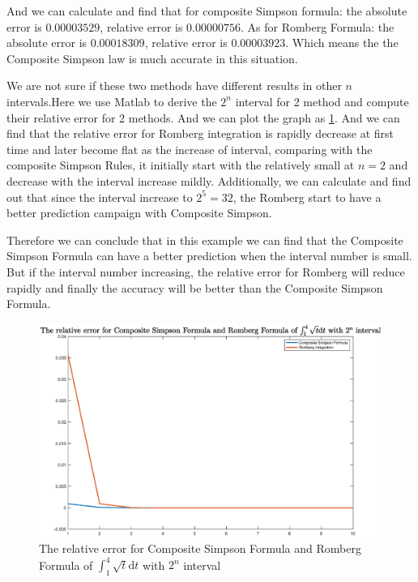 \begin{solution}
And we can calculate and find that for composite Simpson	 formula: the absolute error is $0.00003529$,
 relative error is $0.00000756$. As for Romberg Formula: the absolute error is $0.00018309$, relative error is $0.00003923$. Which means the the Composite Simpson law is much accurate in this situation. 
 
 
We are not sure if these two methods have different results in other $n$ intervals.Here we use Matlab to derive the $2^n$ interval for 2 method and compute their relative error for 2 methods. And we can plot the  graph as \ref{Q3_graph}. And we can find that the relative error for Romberg integration is rapidly decrease at first time and later become flat as the increase of interval, comparing with the composite Simpson Rules, it initially start with the relatively small at $n=2$ and decrease with the interval increase mildly. Additionally, we can calculate and find out that since the interval increase to $2^5=32$, the Romberg start to have a better prediction campaign with Composite Simpson. 


Therefore we can conclude that in this example we can find that the Composite Simpson Formula can have a better prediction when the interval number is small. But if the interval number increasing, the relative error for Romberg will reduce rapidly and finally the accuracy will be better than the Composite Simpson Formula.

\begin{figure}
	\centering
  \includegraphics[width=15cm]{fig/Q3}
  \caption{The relative error for Composite Simpson Formula and Romberg Formula of $\int_1^4 \sqrt{t} \mathrm d t$ with $2^n$ interval} \label{Q3_graph}
\end{figure}


\end{solution}


